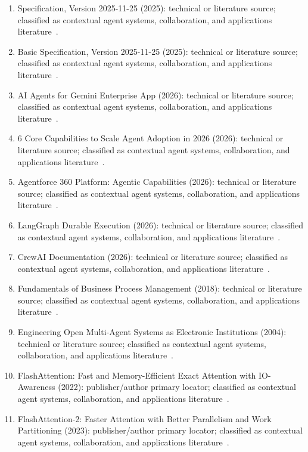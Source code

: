 \begin{enumerate}
\item Specification, Version 2025-11-25 (2025): technical or literature source; classified as contextual agent systems, collaboration, and applications literature~\cite{ext121}.
\item Basic Specification, Version 2025-11-25 (2025): technical or literature source; classified as contextual agent systems, collaboration, and applications literature~\cite{ext122}.
\item {AI} Agents for {Gemini Enterprise} App (2026): technical or literature source; classified as contextual agent systems, collaboration, and applications literature~\cite{ext127}.
\item 6 Core Capabilities to Scale Agent Adoption in 2026 (2026): technical or literature source; classified as contextual agent systems, collaboration, and applications literature~\cite{ext129}.
\item {Agentforce 360 Platform}: Agentic Capabilities (2026): technical or literature source; classified as contextual agent systems, collaboration, and applications literature~\cite{ext130}.
\item {LangGraph} Durable Execution (2026): technical or literature source; classified as contextual agent systems, collaboration, and applications literature~\cite{ext131}.
\item {CrewAI} Documentation (2026): technical or literature source; classified as contextual agent systems, collaboration, and applications literature~\cite{ext132}.
\item Fundamentals of Business Process Management (2018): technical or literature source; classified as contextual agent systems, collaboration, and applications literature~\cite{ext140}.
\item Engineering Open Multi-Agent Systems as Electronic Institutions (2004): technical or literature source; classified as contextual agent systems, collaboration, and applications literature~\cite{ext143}.
\item FlashAttention: Fast and Memory-Efficient Exact Attention with IO-Awareness (2022): publisher/author primary locator; classified as contextual agent systems, collaboration, and applications literature~\cite{ext147}.
\item FlashAttention-2: Faster Attention with Better Parallelism and Work Partitioning (2023): publisher/author primary locator; classified as contextual agent systems, collaboration, and applications literature~\cite{ext148}.
\end{enumerate}
\normalsize

